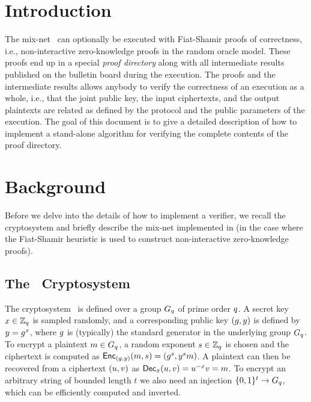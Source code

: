 \documentclass[11pt]{article}
\begin{document}
\section{Introduction}\label{sect:introduction}

The \veri mix-net~\cite{vmn} can optionally be executed with
Fiat-Shamir proofs of correctness, i.e., non-interactive
zero-knowledge proofs in the random oracle model. These proofs end up
in a special \emph{proof directory} along with all intermediate
results published on the bulletin board during the execution. The
proofs and the intermediate results allows anybody to verify the
correctness of an execution as a whole, i.e., that the joint public
key, the input ciphertexts, and the output plaintexts are related as
defined by the protocol and the public parameters of the
execution. The goal of this document is to give a detailed description
of how to implement a stand-alone algorithm for verifying the complete
contents of the proof directory.


\section{Background}

Before we delve into the details of how to implement a verifier, we
recall the \elgamal cryptosystem and briefly describe the mix-net
implemented in \veri (in the case where the Fiat-Shamir heuristic is
used to construct non-interactive zero-knowledge proofs).

\subsection{The \elgamal~Cryptosystem}\label{sect:elgamal}

The \elgamal cryptosystem~\cite{elgamal} is defined over a group $G_{q}$
of prime order $q$. A secret key $x\in\mathbb{Z}_{q}$ is sampled randomly,
and a corresponding public key $(g,y)$ is defined by $y=g^{x}$,
where $g$ is (typically) the standard generator in the underlying
group $G_{q}$. To encrypt a plaintext $m\in G_{q}$, a random exponent
$s\in\mathbb{Z}_{q}$ is chosen and the ciphertext is computed as
$\textsf{Enc}_{(g,y)}(m,s)=(g^{s},y^{s}m)$. A plaintext
can then be recovered from a ciphertext $(u,v)$ as
$\textsf{Dec}_{x}(u,v)=u^{-x}v=m$. To encrypt an
arbitrary string of bounded length $t$ we also need an injection
$\{0,1\}^{t}\to G_{q}$, which can be efficiently computed and inverted.
\end{document}
